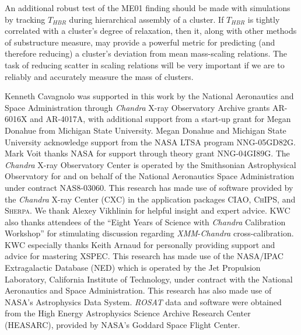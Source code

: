 \documentclass[12pt,preprint]{aastex}
\begin{document}
An additional robust test of the ME01 finding should be made with
simulations by tracking $T_{HBR}$ during hierarchical assembly of a
cluster. If $T_{HBR}$ is tightly correlated with a cluster's degree of
relaxation, then it, along with other methods of substructure measure,
may provide a powerful metric for predicting (and therefore reducing)
a cluster's deviation from mean mass-scaling relations. The
task of reducing scatter in scaling relations will be very important
if we are to reliably and accurately measure the mass of clusters.

\acknowledgements
Kenneth Cavagnolo was supported in this work by the National
Aeronautics and Space Administration through {\it Chandra} X-ray
Observatory Archive grants AR-6016X and AR-4017A, with additional
support from a start-up grant for Megan Donahue from Michigan State
University. Megan Donahue and Michigan State University acknowledge
support from the NASA LTSA program NNG-05GD82G. Mark Voit thanks NASA
for support through theory grant NNG-04GI89G. The {\it Chandra}
X-ray Observatory Center is operated by the Smithsonian Astrophysical
Observatory for and on behalf of the National Aeronautics Space
Administration under contract NAS8-03060. This research has made use
of software provided by the {\it Chandra} X-ray Center (CXC) in the
application packages {\textsc{CIAO}}, {\textsc{ChIPS}}, and
{\textsc{Sherpa}}. We thank Alexey Vikhlinin for helpful insight and
expert advice. KWC also thanks attendees of the ``Eight Years of Science
with {\it Chandra} Calibration Workshop'' for stimulating discussion
regarding {\it XMM}-{\it Chandra} cross-calibration.  KWC especially
thanks Keith Arnaud for personally providing support and advice for
mastering {\textsc{XSPEC}}. This research has made use of the
NASA/IPAC Extragalactic Database (NED) which is operated by the Jet
Propulsion Laboratory, California Institute of Technology, under
contract with the National Aeronautics and Space Administration. This
research has also made use of NASA's Astrophysics Data System. {\it
ROSAT} data and software were obtained from the High Energy
Astrophysics Science Archive Research Center (HEASARC), provided by
NASA's Goddard Space Flight Center.
\end{document}
